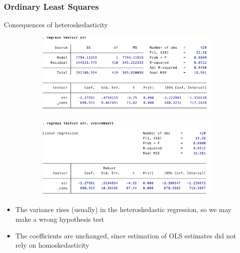 \documentclass[compress]{beamer}
\begin{document}
\begin{frame}
\frametitle{Ordinary Least Squares}
Consequences of heteroskedasticity
\begin{figure}[H]
\centering
\begin{subfigure}[b]{0.49\textwidth}
\includegraphics[width=\textwidth]{nonrobust.png}
\end{subfigure}
\begin{subfigure}[b]{0.49\textwidth}
\includegraphics[width=\textwidth]{robust.png}
\end{subfigure}
\end{figure}
\begin{itemize}
\item The variance rises (usually) in the heteroskedastic regression, so we may make a wrong hypothesis test
\item The coefficients are unchanged, since estimation of OLS estimates did not rely on homoskedasticity
\end{itemize}
\end{frame}
\end{document}
